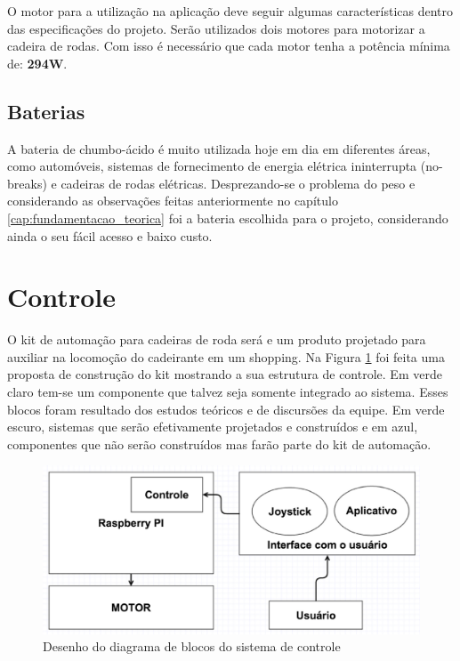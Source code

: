 O motor para a utilização na aplicação deve seguir algumas características dentro das especificações do projeto. Serão utilizados dois motores para motorizar a cadeira de rodas. Com isso é necessário que cada motor tenha a potência mínima de: \textbf{294W}.

\subsection{Baterias}
A bateria de chumbo-ácido é muito utilizada hoje em dia em diferentes áreas,  como automóveis, sistemas de fornecimento de energia elétrica ininterrupta (no-breaks) e cadeiras de rodas elétricas. Desprezando-se o problema do peso e considerando as observações feitas anteriormente no capítulo \ref{cap:fundamentacao_teorica} foi a bateria escolhida para o projeto, considerando ainda o seu fácil acesso e baixo  custo.

\section{Controle}

O kit de automação para cadeiras de roda será e um produto projetado para auxiliar na locomoção do cadeirante em um shopping. Na Figura \ref{fig:diagrama_blocos} foi feita uma proposta de construção do kit mostrando a sua estrutura de controle. Em verde claro tem-se um componente que talvez seja somente integrado ao sistema. Esses blocos foram resultado dos estudos teóricos e de discursões da equipe. Em verde escuro, sistemas que serão efetivamente projetados e construídos e em azul, componentes que não serão construídos mas farão parte do kit de automação.

\begin{figure}[!htb]
\centering
  \includegraphics[keepaspectratio=true,scale=0.6]{figuras/controle/diagrama_blocos}
\caption{Desenho do diagrama de blocos do sistema de controle}
\label{fig:diagrama_blocos}
\end{figure}



